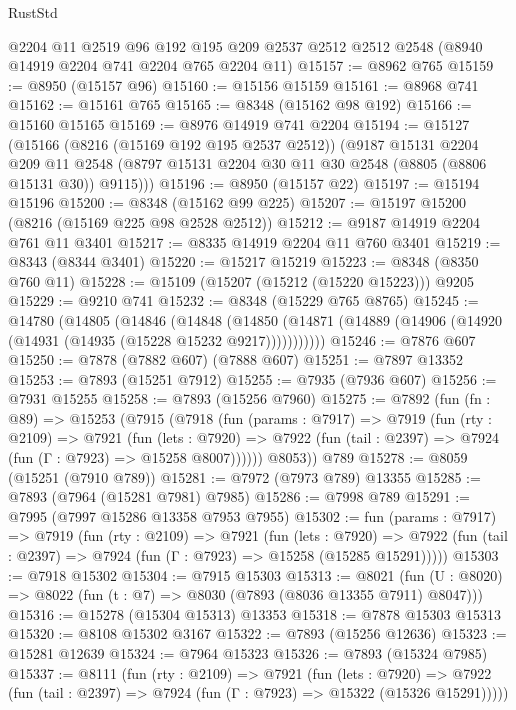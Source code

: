 \begin{lexlean}{RustStd}
\begin{coremodule}
{\begin{coremodule}
{{{{{{{{{{{{{{{{{{{{{{{{{{{{{{{{{{{{{{{{{{{{{{{{{{    @2204
    @11
    @2519
    @96
    @192
    @195
    @209
    @2537
    @2512
    @2512
    @2548
    (@8940 @14919 @2204 @741 @2204 @765 @2204 @11)
@15157 := @8962 @765
@15159 := @8950 (@15157 @96)
@15160 := @15156 @15159
@15161 := @8968 @741
@15162 := @15161 @765
@15165 := @8348 (@15162 @98 @192)
@15166 := @15160 @15165
@15169 := @8976 @14919 @741 @2204
@15194 := @15127
    (@15166
      (@8216 (@15169 @192 @195 @2537 @2512))
      (@9187
        @15131
        @2204
        @209
        @11
        @2548
        (@8797 @15131 @2204 @30 @11 @30 @2548 (@8805 (@8806 @15131 @30)) @9115)))
@15196 := @8950 (@15157 @22)
@15197 := @15194 @15196
@15200 := @8348 (@15162 @99 @225)
@15207 := @15197 @15200 (@8216 (@15169 @225 @98 @2528 @2512))
@15212 := @9187 @14919 @2204 @761 @11 @3401
@15217 := @8335 @14919 @2204 @11 @760 @3401
@15219 := @8343 (@8344 @3401)
@15220 := @15217 @15219
@15223 := @8348 (@8350 @760 @11)
@15228 := @15109 (@15207 (@15212 (@15220 @15223))) @9205
@15229 := @9210 @741
@15232 := @8348 (@15229 @765 @8765)
@15245 := @14780
    (@14805
      (@14846
        (@14848
          (@14850 (@14871 (@14889 (@14906 (@14920 (@14931 (@14935 (@15228 @15232 @9217)))))))))))
@15246 := @7876 @607
@15250 := @7878 (@7882 @607) (@7888 @607)
@15251 := @7897 @13352
@15253 := @7893 (@15251 @7912)
@15255 := @7935 (@7936 @607)
@15256 := @7931 @15255
@15258 := @7893 (@15256 @7960)
@15275 := @7892
    (fun (fn : @89) =>
    @15253
      (@7915
        (@7918
          (fun (params : @7917) =>
          @7919
            (fun (rty : @2109) =>
            @7921
              (fun (lets : @7920) =>
              @7922 (fun (tail : @2397) => @7924 (fun (Γ : @7923) => @15258 @8007))))))
        @8053))
    @789
@15278 := @8059 (@15251 (@7910 @789))
@15281 := @7972 (@7973 @789) @13355
@15285 := @7893 (@7964 (@15281 @7981) @7985)
@15286 := @7998 @789
@15291 := @7995 (@7997 @15286 @13358 @7953 @7955)
@15302 := fun (params : @7917) =>
  @7919
    (fun (rty : @2109) =>
    @7921
      (fun (lets : @7920) =>
      @7922 (fun (tail : @2397) => @7924 (fun (Γ : @7923) => @15258 (@15285 @15291)))))
@15303 := @7918 @15302
@15304 := @7915 @15303
@15313 := @8021
    (fun (U : @8020) => @8022 (fun (t : @7) => @8030 (@7893 (@8036 @13355 @7911) @8047)))
@15316 := @15278 (@15304 @15313) @13353
@15318 := @7878 @15303 @15313
@15320 := @8108 @15302 @3167
@15322 := @7893 (@15256 @12636)
@15323 := @15281 @12639
@15324 := @7964 @15323
@15326 := @7893 (@15324 @7985)
@15337 := @8111
    (fun (rty : @2109) =>
    @7921
      (fun (lets : @7920) =>
      @7922 (fun (tail : @2397) => @7924 (fun (Γ : @7923) => @15322 (@15326 @15291)))))
}}}}}}}}}}}}}}}}}}}}}}}}}}}}}}}}}}}}}}}}}}}}}}}}}}
\end{coremodule}}
\end{coremodule}
\end{lexlean}
